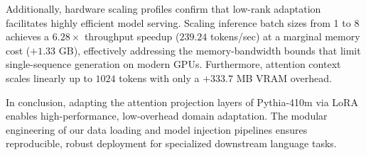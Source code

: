 \documentclass[11pt,a4paper]{article}
\begin{document}
Additionally, hardware scaling profiles confirm that low-rank adaptation facilitates highly efficient model serving. Scaling inference batch sizes from 1 to 8 achieves a $6.28\times$ throughput speedup ($239.24$ tokens/sec) at a marginal memory cost ($+1.33$ GB), effectively addressing the memory-bandwidth bounds that limit single-sequence generation on modern GPUs. Furthermore, attention context scales linearly up to $1024$ tokens with only a $+333.7$ MB VRAM overhead. 

In conclusion, adapting the attention projection layers of Pythia-410m via LoRA enables high-performance, low-overhead domain adaptation. The modular engineering of our data loading and model injection pipelines ensures reproducible, robust deployment for specialized downstream language tasks.
\end{document}
